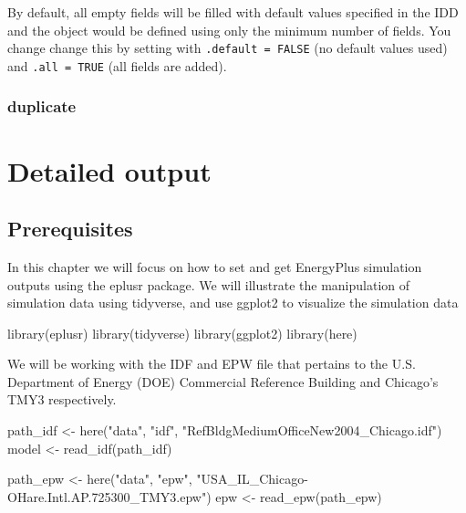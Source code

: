 \documentclass[
]{book}
\newenvironment{Shaded}{\begin{snugshade}}{\end{snugshade}}
\newcommand{\FunctionTok}[1]{\textcolor[rgb]{0.00,0.00,0.00}{#1}}
\newcommand{\NormalTok}[1]{#1}
\newcommand{\OtherTok}[1]{\textcolor[rgb]{0.56,0.35,0.01}{#1}}
\newcommand{\StringTok}[1]{\textcolor[rgb]{0.31,0.60,0.02}{#1}}
\begin{document}
By default, all empty fields will be filled with default values specified in the IDD and the object would be defined using only the minimum number of fields. You change change this by setting with \texttt{.default\ =\ FALSE} (no default values used) and \texttt{.all\ =\ TRUE} (all fields are added).

\hypertarget{duplicate}{%
\subsection{duplicate}\label{duplicate}}

\hypertarget{output}{%
\chapter{Detailed output}\label{output}}

\hypertarget{prerequisites-12}{%
\section{Prerequisites}\label{prerequisites-12}}

In this chapter we will focus on how to set and get EnergyPlus simulation outputs using the eplusr package. We will illustrate the manipulation of simulation data using tidyverse, and use ggplot2 to visualize the simulation data

\begin{Shaded}
\begin{Highlighting}[]
\FunctionTok{library}\NormalTok{(eplusr)}
\FunctionTok{library}\NormalTok{(tidyverse)}
\FunctionTok{library}\NormalTok{(ggplot2)}
\FunctionTok{library}\NormalTok{(here)}
\end{Highlighting}
\end{Shaded}

We will be working with the IDF and EPW file that pertains to the U.S. Department of Energy (DOE) Commercial Reference Building and Chicago's TMY3 respectively.

\begin{Shaded}
\begin{Highlighting}[]
\NormalTok{path\_idf }\OtherTok{\textless{}{-}} \FunctionTok{here}\NormalTok{(}\StringTok{"data"}\NormalTok{, }\StringTok{"idf"}\NormalTok{, }\StringTok{"RefBldgMediumOfficeNew2004\_Chicago.idf"}\NormalTok{)}
\NormalTok{model }\OtherTok{\textless{}{-}} \FunctionTok{read\_idf}\NormalTok{(path\_idf)}

\NormalTok{path\_epw }\OtherTok{\textless{}{-}} \FunctionTok{here}\NormalTok{(}\StringTok{"data"}\NormalTok{, }\StringTok{"epw"}\NormalTok{, }\StringTok{"USA\_IL\_Chicago{-}OHare.Intl.AP.725300\_TMY3.epw"}\NormalTok{)}
\NormalTok{epw }\OtherTok{\textless{}{-}} \FunctionTok{read\_epw}\NormalTok{(path\_epw)}
\end{Highlighting}
\end{Shaded}
\end{document}
